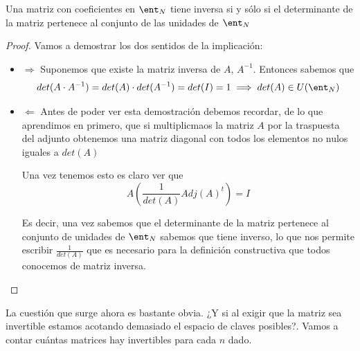 \begin{prop}
Una matriz con coeficientes en $\ent_{N}$ tiene inversa si y sólo si el determinante de la matriz pertenece al conjunto de las unidades de $\ent_{N}$
\end{prop}
\begin{proof}
Vamos a demostrar los dos sentidos de la implicación:
\begin{itemize}
\item $\Rightarrow$
Suponemos que existe la matriz inversa de $A$, $A^{-1}$. Entonces sabemos que
\[det(A\cdot A^{-1})=det(A)\cdot det(A^{-1}) = det(I) = 1 \implies det(A) \in U(\ent_{N})\]
\item $\Leftarrow$
Antes de poder ver esta demostración debemos recordar, de lo que aprendimos en primero, que si multiplicmaos la matriz $A$ por la traspuesta del adjunto obtenemos una matriz diagonal con todos los elementos no nulos iguales a $det(A)$

Una vez tenemos esto es claro ver que
\[A \left( \frac{1}{det(A)}Adj(A)^t \right) = I\]

Es decir, una vez sabemos que el determinante de la matriz pertenece al conjunto de unidades de $\ent_N$ sabemos que tiene inverso, lo que nos permite escribir $\frac{1}{det(A)}$ que es necesario para la definición constructiva que todos conocemos de matriz inversa.
\end{itemize}
\end{proof}

La cuestión que surge ahora es bastante obvia. ¿Y si al exigir que la matriz sea invertible estamos acotando demasiado el espacio de claves posibles?. Vamos a contar cuántas matrices hay invertibles para cada $n$ dado.

